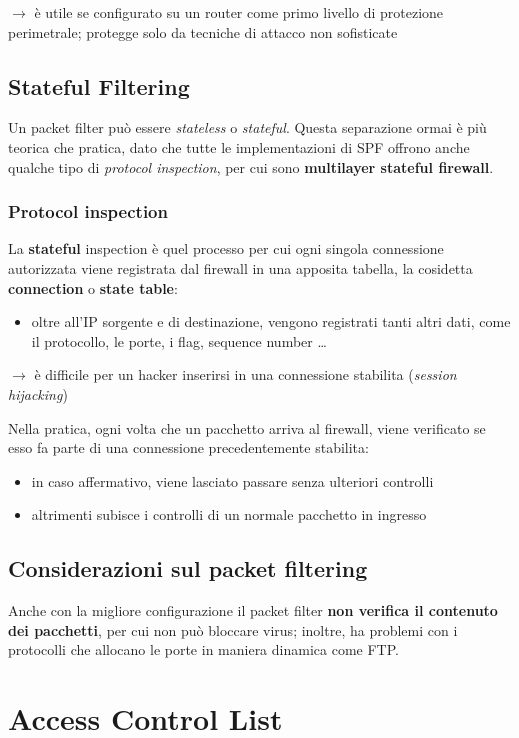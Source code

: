 \noindent $\rightarrow$ è utile se configurato su un router come primo livello di protezione perimetrale; protegge solo da 
tecniche di attacco non sofisticate

\subsection{Stateful Filtering}
Un packet filter può essere \textit{stateless} o \textit{stateful}. Questa separazione 
ormai è più teorica che pratica, dato che tutte le implementazioni di SPF offrono anche qualche tipo 
di \textit{protocol inspection}, per cui sono \textbf{multilayer stateful firewall}.

\subsubsection{Protocol inspection}
La \textbf{stateful} inspection è quel processo per cui ogni singola connessione autorizzata 
viene registrata dal firewall in una apposita tabella, la cosidetta \textbf{connection} o \textbf{state table}:
\begin{itemize}
    \item oltre all'IP sorgente e di destinazione, vengono registrati tanti altri dati, come 
    il protocollo, le porte, i flag, sequence number \dots
\end{itemize}

$\rightarrow$ è difficile per un hacker inserirsi in una connessione stabilita (\textit{session hijacking})

\noindent Nella pratica, ogni volta che un pacchetto arriva al firewall, viene verificato 
se esso fa parte di una connessione precedentemente stabilita:
\begin{itemize}
    \item in caso affermativo, viene lasciato passare senza ulteriori controlli 
    \item altrimenti subisce i controlli di un normale pacchetto in ingresso
\end{itemize}

\subsection{Considerazioni sul packet filtering}
Anche con la migliore configurazione il packet filter \textbf{non verifica 
il contenuto dei pacchetti}, per cui non può bloccare virus; inoltre, ha problemi
con i protocolli che allocano le porte in maniera dinamica come FTP.

\section{Access Control List}









